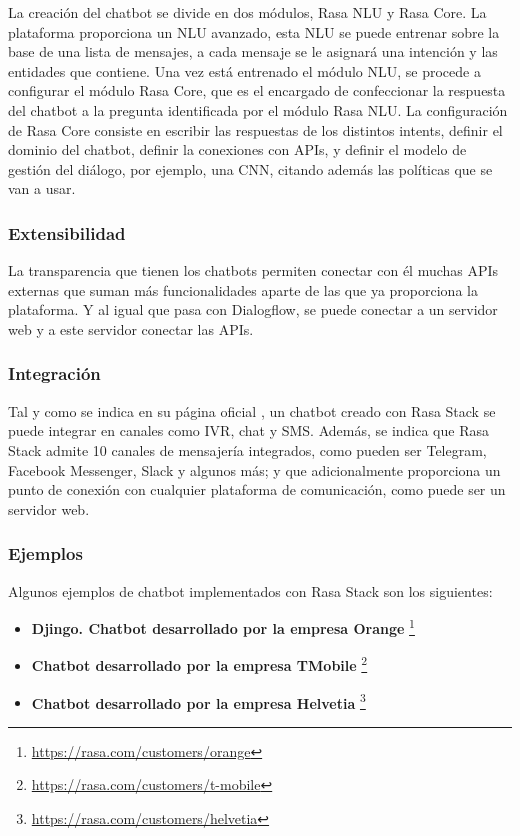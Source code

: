 La creación del chatbot se divide en dos módulos, Rasa NLU y Rasa Core. La plataforma proporciona un \gls{NLU} avanzado, esta \gls{NLU} se puede entrenar sobre la base de una lista de mensajes, a cada mensaje se le asignará una intención y las entidades que contiene. Una vez está entrenado el módulo \gls{NLU}, se procede a configurar el módulo Rasa Core, que es el encargado de confeccionar la respuesta del chatbot a la pregunta identificada por el módulo Rasa NLU. La configuración de Rasa Core consiste en escribir las respuestas de los distintos intents, definir el dominio del chatbot, definir la conexiones con \glspl{API}, y definir el modelo de gestión del diálogo, por ejemplo, una \gls{CNN}, citando además las políticas que se van a usar.

\subsubsection*{Extensibilidad}

La transparencia que tienen los chatbots permiten conectar con él muchas \glspl{API} externas que suman más funcionalidades aparte de las que ya proporciona la plataforma. Y al igual que pasa con Dialogflow, se puede conectar a un servidor web y a este servidor conectar las \glspl{API}.

\subsubsection*{Integración}

Tal y como se indica en su página oficial \cite{RefWorks:RefID:20-2020rasa}, un chatbot creado con Rasa Stack se puede integrar en canales como IVR, chat y SMS. Además, se indica que Rasa Stack admite 10 canales de mensajería integrados, como pueden ser Telegram, Facebook Messenger, Slack y algunos más; y que adicionalmente proporciona un punto de conexión con cualquier plataforma de comunicación, como puede ser un servidor web.

\subsubsection*{Ejemplos}

Algunos ejemplos de chatbot implementados con Rasa Stack son los siguientes:

\begin{itemize}
\item \textbf{Djingo. Chatbot desarrollado por la empresa Orange} \footnote{\url{https://rasa.com/customers/orange}}
\item \textbf{Chatbot desarrollado por la empresa TMobile} \footnote{\url{https://rasa.com/customers/t-mobile}}
\item \textbf{Chatbot desarrollado por la empresa Helvetia} \footnote{\url{https://rasa.com/customers/helvetia}}
\end{itemize}


